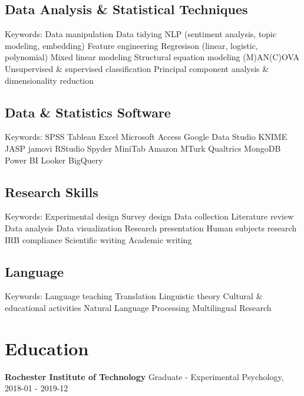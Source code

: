 \documentclass[letterpaper]{deedy-resume_sm}
\begin{document}
\subsection{Data Analysis \& Statistical Techniques}
Keywords: Data manipulation \textbullet{} Data tidying \textbullet{} NLP (sentiment analysis, topic modeling, embedding) \textbullet{} Feature engineering \textbullet{} Regresison (linear, logistic, polynomial) \textbullet{} Mixed linear modeling \textbullet{} Structural equation modeling \textbullet{} (M)AN(C)OVA \textbullet{} Unsupervised \& supervised classification \textbullet{} Principal component analysis \& dimensionality reduction

\subsection{Data \& Statistics Software}
Keywords: SPSS \textbullet{} Tableau \textbullet{} Excel \textbullet{} Microsoft Access \textbullet{} Google Data Studio \textbullet{} KNIME \textbullet{} JASP \textbullet{} jamovi \textbullet{} RStudio \textbullet{} Spyder \textbullet{} MiniTab \textbullet{} Amazon MTurk \textbullet{} Qualtrics \textbullet{} MongoDB \textbullet{} Power BI \textbullet{} Looker \textbullet{} BigQuery

\subsection{Research Skills}
Keywords: Experimental design \textbullet{} Survey design \textbullet{} Data collection \textbullet{} Literature review \textbullet{} Data analysis \textbullet{} Data visualization \textbullet{} Research presentation \textbullet{} Human subjects research \textbullet{} IRB compliance \textbullet{} Scientific writing \textbullet{} Academic writing

\subsection{Language}
Keywords: Language teaching \textbullet{} Translation \textbullet{} Linguistic theory \textbullet{} Cultural \& educational activities \textbullet{} Natural Language Processing \textbullet{} Multilingual Research

\section{Education}
\textbf{Rochester Institute of Technology}
Graduate - Experimental Psychology, 2018-01 - 2019-12
\end{document}
